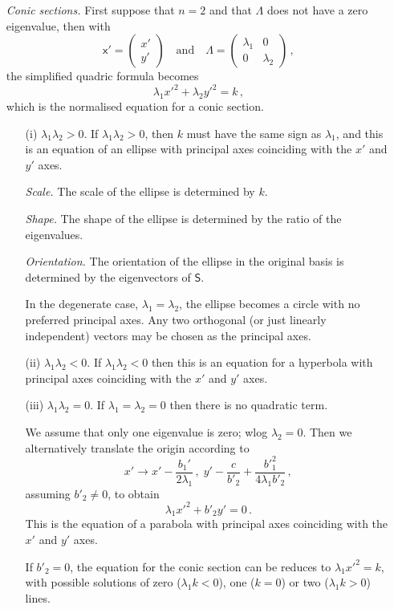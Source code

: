 \documentclass{article}
\theoremstyle{plain}\theoremheaderfont{\normalfont\itshape}\theorembodyfont{\rmfamily}\theoremseparator{.}\newtheorem*{rem}{Remark}\newtheorem*{ex}{Example}\newtheorem*{proof}{Proof}\newtheorem*{altp}{Alternative proof}
\theoremstyle{plain}\theoremheaderfont{\normalfont\bfseries}\theorembodyfont{\rmfamily}\theoremseparator{.}\newtheorem{thm}{Theorem}[section]\newtheorem{lem}[thm]{Lemma}\newtheorem{prop}[thm]{Proposition}\newtheorem*{cor}{Corollary}\newtheorem{defn}[thm]{Definition}\newtheorem{clm}[thm]{Claim}\newtheorem{clminproof}{Claim}
\theoremstyle{break}\theoremheaderfont{\normalfont\itshape}\theorembodyfont{\rmfamily}\theoremseparator{.\medskip}\newtheorem*{proofskip}{Proof}\newtheorem*{exs}{Examples}\newtheorem*{rems}{Remarks}
\theoremstyle{break}\theoremheaderfont{\normalfont\bfseries}\theorembodyfont{\rmfamily}\theoremseparator{.\medskip}\newtheorem{lemskip}[thm]{Lemma}\newtheorem{defnskip}[thm]{Definition}\newtheorem{propskip}[thm]{Proposition}\newtheorem{thmskip}[thm]{Theorem}
\numberwithin{equation}{section}
\begin{document}
	\begin{itemize}[leftmargin=30pt,itemindent=40pt]
		\item[\textit{Conic sections.}] First suppose that \(n=2\) and that \(\mathsf{\Lambda}\) does not have a zero eigenvalue, then with
		\[\mathsf{x'}=\begin{pmatrix}
			x' \\ y'
		\end{pmatrix}\quad\text{and}\quad\mathsf{\Lambda}=\begin{pmatrix}
			\lambda_1 & 0 \\ 0 & \lambda_2
		\end{pmatrix}\,,\]
		the simplified quadric formula becomes
		\[\lambda_1x'^2+\lambda_2y'^2=k\,,\]
		which is the normalised equation for a conic section.

		\begin{itemize}[topsep=0pt,parsep=1em,leftmargin=50pt,itemindent=20pt]
			\item[(i) \(\lambda_1\lambda_2>0\).] If \(\lambda_1\lambda_2>0\), then \(k\) must have the same sign as \(\lambda_1\), and this is an equation of an ellipse with principal axes coinciding with the \(x'\) and \(y'\) axes.
			
			\textit{Scale.} The scale of the ellipse is determined by \(k\).
			
			\textit{Shape.} The shape of the ellipse is determined by the ratio of the eigenvalues.
			
			\textit{Orientation.} The orientation of the ellipse in the original basis is determined by the eigenvectors of \(\mathsf{S}\).
			
			In the degenerate case, \(\lambda_1=\lambda_2\), the ellipse becomes a circle with no preferred principal axes. Any two orthogonal (or just linearly independent) vectors may be chosen as the principal axes. 
			\item[(ii) \(\lambda_1\lambda_2<0\).] If \(\lambda_1\lambda_2<0\) then this is an equation for a hyperbola with principal axes coinciding with the \(x'\) and \(y'\) axes.
			\item[(iii) \(\lambda_1\lambda_2=0\).] If \(\lambda_1=\lambda_2=0\) then there is no quadratic term.
			
			We assume that only one eigenvalue is zero; wlog \(\lambda_2=0\). Then we alternatively translate the origin according to
			\[x'\to x'-\frac{b_1'}{2\lambda_1}\,,\;y'-\frac{c}{b'_2}+\frac{{b'}_1^2}{4\lambda_1 b'_2}\,,\]
			assuming \(b'_2\ne 0\), to obtain
			\[\lambda_1 x'^2+b'_2y'=0\,.\]
			This is the equation of a parabola with principal axes coinciding with the \(x'\) and \(y'\) axes.
			
			If \(b'_2=0\), the equation for the conic section can be reduces to \(\lambda_1 x'^2=k\), with possible solutions of zero (\(\lambda_1 k<0\)), one (\(k=0\)) or two (\(\lambda_1k>0\)) lines. 
		\end{itemize}
	\end{itemize}
	
\end{document}
